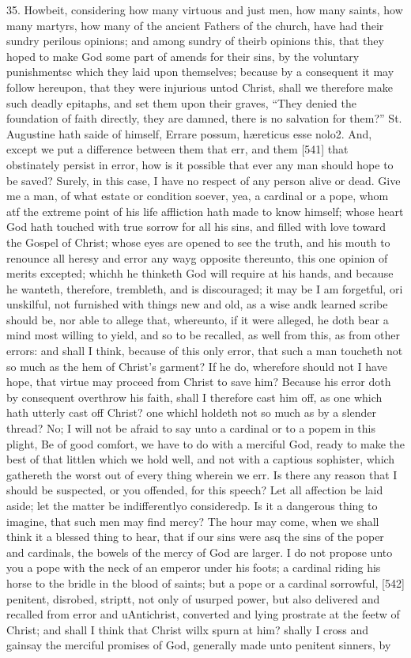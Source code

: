 35. Howbeit, considering how many virtuous and just men, how many saints, how many martyrs, how many of the ancient Fathers of the church, have had their sundry perilous opinions; and among sundry of theirb opinions this, that they hoped to make God some part of amends for their sins, by the voluntary punishmentsc which they laid upon themselves; because by a consequent it may follow hereupon, that they were injurious untod Christ, shall we therefore make such deadly epitaphs, and set them upon their graves, “They denied the foundation of faith directly, they are damned, there is no salvation for them?” St. Augustine hath saide of himself, Errare possum, hæreticus esse nolo2. And, except we put a difference between them that err, and them [541] that obstinately persist in error, how is it possible that ever any man should hope to be saved? Surely, in this case, I have no respect of any person alive or dead. Give me a man, of what estate or condition soever, yea, a cardinal or a pope, whom atf the extreme point of his life affliction hath made to know himself; whose heart God hath touched with true sorrow for all his sins, and filled with love toward the Gospel of Christ; whose eyes are opened to see the truth, and his mouth to renounce all heresy and error any wayg opposite thereunto, this one opinion of merits excepted; whichh he thinketh God will require at his hands, and because he wanteth, therefore, trembleth, and is discouraged; it may be I am forgetful, ori unskilful, not furnished with things new and old, as a wise andk learned scribe should be, nor able to allege that, whereunto, if it were alleged, he doth bear a mind most willing to yield, and so to be recalled, as well from this, as from other errors: and shall I think, because of this only error, that such a man toucheth not so much as the hem of Christ’s garment? If he do, wherefore should not I have hope, that virtue may proceed from Christ to save him? Because his error doth by consequent overthrow his faith, shall I therefore cast him off, as one which hath utterly cast off Christ? one whichl holdeth not so much as by a slender thread? No; I will not be afraid to say unto a cardinal or to a popem in this plight, Be of good comfort, we have to do with a merciful God, ready to make the best of that littlen which we hold well, and not with a captious sophister, which gathereth the worst out of every thing wherein we err. Is there any reason that I should be suspected, or you offended, for this speech? Let all affection be laid aside; let the matter be indifferentlyo consideredp. Is it a dangerous thing to imagine, that such men may find mercy? The hour may come, when we shall think it a blessed thing to hear, that if our sins were asq the sins of the poper and cardinals, the bowels of the mercy of God are larger. I do not propose unto you a pope with the neck of an emperor under his foots; a cardinal riding his horse to the bridle in the blood of saints; but a pope or a cardinal sorrowful, [542] penitent, disrobed, striptt, not only of usurped power, but also delivered and recalled from error and uAntichrist, converted and lying prostrate at the feetw of Christ; and shall I think that Christ willx spurn at him? shally I cross and gainsay the merciful promises of God, generally made unto penitent sinners, by 